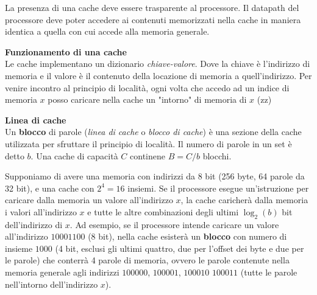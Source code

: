 \begin{note}
    La presenza di una cache deve essere trasparente al processore. Il datapath
    del processore deve poter accedere ai contenuti memorizzati nella cache in
    maniera identica a quella con cui accede alla memoria generale.
\end{note}

\begin{defn}
    \textbf{Funzionamento di una cache} \\
    Le cache implementano un dizionario \textit{chiave-valore}. Dove la chiave è
    l'indirizzo di memoria e il valore è il contenuto della locazione di memoria
    a quell'indirizzo. Per venire incontro al principio di località, ogni volta
    che accedo ad un indice di memoria $x$ posso caricare nella cache un
    "intorno" di memoria di $x$ (zz)
\end{defn}

\begin{defn}
    \textbf{Linea di cache} \\
    Un \textbf{blocco} di parole (\textit{linea di cache} o \textit{blocco di
    cache}) è una sezione della cache utilizzata per sfruttare il principio di
    località. Il numero di parole in un set è detto $b$. Una cache di capacità
    $C$ continene $B=C/b$ blocchi.
\end{defn}

\begin{exmp}
    Supponiamo di avere una memoria con indirizzi da 8 bit (256 byte, 64 parole
    da 32 bit), e una cache con $2^4 = 16$ insiemi. Se il processore esegue
    un'istruzione per caricare dalla memoria un valore all'indirizzo $x$, la
    cache caricherà dalla memoria i valori all'indirizzo $x$ e tutte le altre
    combinazioni degli ultimi $\log_2(b)$ bit dell'indirizzo di $x$. Ad esempio,
    se il processore intende caricare un valore all'indirizzo $10001100$ (8
    bit), nella cache esisterà un \textbf{blocco} con numero di insieme $1000$
    (4 bit, esclusi gli ultimi quattro, due per l'offset dei byte e due per le
    parole) che conterrà 4 parole di memoria, ovvero le parole contenute nella
    memoria generale agli indirizzi $100000$, $100001$, $100010$ $100011$ (tutte
    le parole nell'intorno dell'indirizzo $x$).
\end{exmp}

